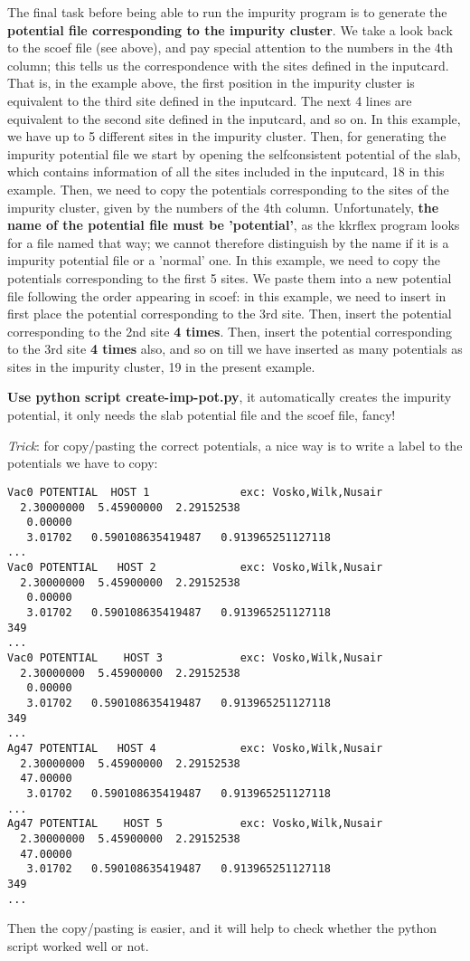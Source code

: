 \documentclass[11pt,fleqn]{book} %
\begin{document}
The final task before being able to run the impurity
program is to generate the \textbf{potential file corresponding to the
impurity cluster}.
We take a look back to the  scoef file (see above), and pay special attention to
the numbers in the 4th column; this tells us
the correspondence with the sites defined in the inputcard.
That is, in the example above, the first position in the impurity cluster
is equivalent to the third site defined in the inputcard. The next 4 lines are equivalent
to the second site defined in the inputcard, and so on.
In this example, we have up to 5 different sites in the impurity cluster. Then,
for generating the impurity potential file we start by opening the
selfconsistent potential of the slab, which contains information of
all the sites included in the inputcard, 18 in this example.
Then, we need to copy the potentials corresponding to the sites
of the impurity cluster, given by the numbers of the 4th column.
Unfortunately, \textbf{the name of the potential file
must be 'potential'}, as the kkrflex program looks
for a file named that way; we cannot therefore distinguish
by the name if it is a impurity potential file or a
'normal' one.
In this example, we need to copy the potentials corresponding to the
first 5 sites. We paste them into a new potential file
following the
order appearing in scoef: in this example, we need to insert in first place
the potential corresponding to the 3rd site. Then, insert the potential
corresponding to the 2nd site \textbf{4 times}. Then, insert the potential
corresponding to the 3rd site \textbf{4 times} also, and so on till we have inserted
as many potentials as sites in the impurity cluster, 19 in the present example.

\textbf{Use python script create-imp-pot.py}, it automatically creates the impurity potential,
it only needs the slab potential file and the scoef file, fancy!

\textit{Trick}: for copy/pasting the correct potentials, a nice way
is to write a label to the potentials we have to copy:
\begin{VBox}
\begin{verbatim}
Vac0 POTENTIAL  HOST 1              exc: Vosko,Wilk,Nusair
  2.30000000  5.45900000  2.29152538
   0.00000
   3.01702   0.590108635419487   0.913965251127118
...
Vac0 POTENTIAL   HOST 2             exc: Vosko,Wilk,Nusair
  2.30000000  5.45900000  2.29152538
   0.00000
   3.01702   0.590108635419487   0.913965251127118
349
...
Vac0 POTENTIAL    HOST 3            exc: Vosko,Wilk,Nusair
  2.30000000  5.45900000  2.29152538
   0.00000
   3.01702   0.590108635419487   0.913965251127118
349
...
Ag47 POTENTIAL   HOST 4             exc: Vosko,Wilk,Nusair
  2.30000000  5.45900000  2.29152538
  47.00000
   3.01702   0.590108635419487   0.913965251127118
...
Ag47 POTENTIAL    HOST 5            exc: Vosko,Wilk,Nusair
  2.30000000  5.45900000  2.29152538
  47.00000
   3.01702   0.590108635419487   0.913965251127118
349
...
\end{verbatim}
\end{VBox}
Then the copy/pasting is easier, and it will help to check whether the python
script worked well or not.
\end{document}
